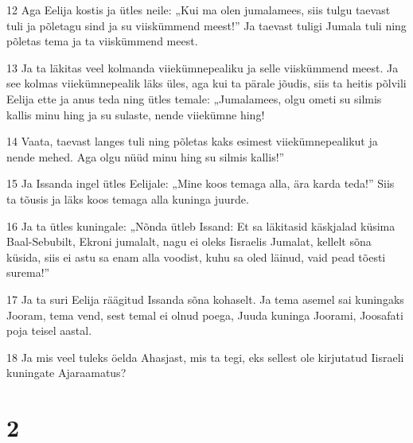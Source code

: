 \par 12 Aga Eelija kostis ja ütles neile: „Kui ma olen jumalamees, siis tulgu taevast tuli ja põletagu sind ja su viiskümmend meest!” Ja taevast tuligi Jumala tuli ning põletas tema ja ta viiskümmend meest.
\par 13 Ja ta läkitas veel kolmanda viiekümnepealiku ja selle viiskümmend meest. Ja see kolmas viiekümnepealik läks üles, aga kui ta pärale jõudis, siis ta heitis põlvili Eelija ette ja anus teda ning ütles temale: „Jumalamees, olgu ometi su silmis kallis minu hing ja su sulaste, nende viiekümne hing!
\par 14 Vaata, taevast langes tuli ning põletas kaks esimest viiekümnepealikut ja nende mehed. Aga olgu nüüd minu hing su silmis kallis!”
\par 15 Ja Issanda ingel ütles Eelijale: „Mine koos temaga alla, ära karda teda!” Siis ta tõusis ja läks koos temaga alla kuninga juurde.
\par 16 Ja ta ütles kuningale: „Nõnda ütleb Issand: Et sa läkitasid käskjalad küsima Baal-Sebubilt, Ekroni jumalalt, nagu ei oleks Iisraelis Jumalat, kellelt sõna küsida, siis ei astu sa enam alla voodist, kuhu sa oled läinud, vaid pead tõesti surema!”
\par 17 Ja ta suri Eelija räägitud Issanda sõna kohaselt. Ja tema asemel sai kuningaks Jooram, tema vend, sest temal ei olnud poega, Juuda kuninga Joorami, Joosafati poja teisel aastal.
\par 18 Ja mis veel tuleks öelda Ahasjast, mis ta tegi, eks sellest ole kirjutatud Iisraeli kuningate Ajaraamatus?

\chapter{2}

